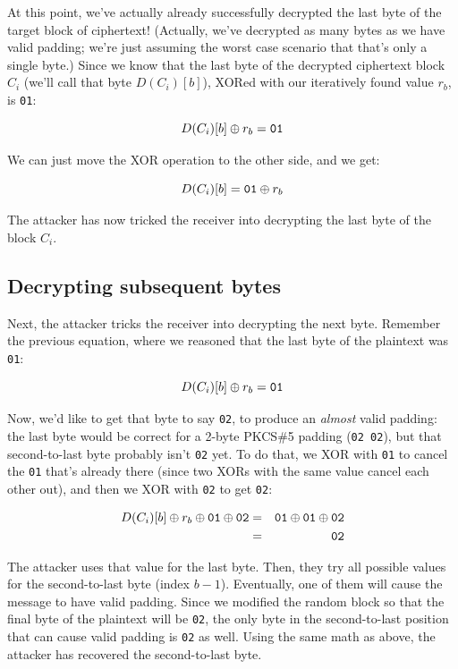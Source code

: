 \documentclass[11pt,ebook,table,dvipsnames]{memoir}
\begin{document}
At this point, we've actually already successfully decrypted the last
byte of the target block of ciphertext! (Actually, we've decrypted as
many bytes as we have valid padding; we're just assuming the worst
case scenario that that's only a single byte.) Since we know that the
last byte of the decrypted ciphertext block $C_i$ (we'll call that
byte $D(C_i)[b]$), XORed with our iteratively found value $r_b$, is
\verb|01|:

\[
D(C_i)[b] \oplus r_b = \mathtt{01}
\]

We can just move the XOR operation to the other side, and we get:

\[
D(C_i)[b] = \mathtt{01} \oplus r_b
\]

The attacker has now tricked the receiver into decrypting the last
byte of the block $C_i$.
\subsection{Decrypting subsequent bytes}
\label{sec-2-3-9-4}

Next, the attacker tricks the receiver into decrypting the next byte.
Remember the previous equation, where we reasoned that the last byte
of the plaintext was \verb~01~:

\[
D(C_i)[b] \oplus r_b = \mathtt{01}
\]

Now, we'd like to get that byte to say \verb~02~, to produce an \emph{almost}
valid padding: the last byte would be correct for a 2-byte PKCS\#5
padding (\verb~02 02~), but that second-to-last byte probably isn't \verb~02~
yet. To do that, we XOR with \verb~01~ to cancel the \verb~01~ that's already
there (since two XORs with the same value cancel each other out), and
then we XOR with \verb~02~ to get \verb~02~:

\begin{eqnarray*}
D(C_i)[b] \oplus r_b \oplus \mathtt{01} \oplus \mathtt{02} & = & \mathtt{01} \oplus \mathtt{01} \oplus \mathtt{02} \\
& = & \mathtt{02}
\end{eqnarray*}

The attacker uses that value for the last byte. Then, they try all
possible values for the second-to-last byte (index $b - 1$).
Eventually, one of them will cause the message to have valid padding.
Since we modified the random block so that the final byte of the
plaintext will be \verb|02|, the only byte in the second-to-last
position that can cause valid padding is \verb|02| as well. Using the
same math as above, the attacker has recovered the second-to-last
byte.
\end{document}
